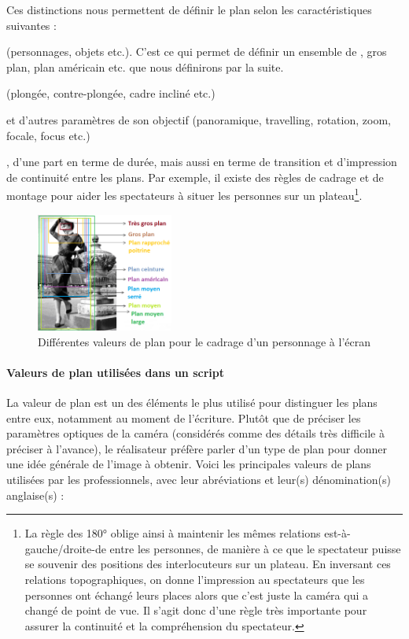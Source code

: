 Ces distinctions nous permettent de définir le plan selon les caractéristiques suivantes : 
\begin{liste}
	\item {} (personnages, objets etc.).
	C'est ce qui permet de définir un ensemble de , gros plan, plan américain etc. que nous définirons par la suite.
	
	\item {} (plongée, contre-plongée, cadre incliné etc.)

	\item {} et d'autres paramètres de son objectif (panoramique, travelling, rotation, zoom, focale, focus etc.)

	\item {}, d'une part en terme de durée, mais aussi en terme de transition et d'impression de continuité entre les plans. 
	Par exemple, il existe des règles de cadrage et de montage pour aider les spectateurs à situer les personnes sur un plateau\footnote{La règle des 180° oblige ainsi à maintenir les mêmes relations est-à-gauche/droite-de entre les personnes, de manière à ce que le spectateur puisse se souvenir des positions des interlocuteurs sur un plateau. En inversant ces relations topographiques, on donne l'impression au spectateurs que les personnes ont échangé leurs places alors que c'est juste la caméra qui a changé de point de vue. Il s'agit donc d'une règle très importante pour assurer la continuité et la compréhension du spectateur.}.
\end{liste}

\begin{figure}[ht!]
\centering
\includegraphics[width=0.4\textwidth]{./images/ValeurPlan-v1.png}
\caption{Différentes valeurs de plan pour le cadrage d'un personnage à l'écran}
\label{img:intro:script}
\end{figure}

\paragraph{Valeurs de plan utilisées dans un script}
La valeur de plan est un des éléments le plus utilisé pour distinguer les plans entre eux, notamment au moment de l'écriture. 
Plutôt que de préciser les paramètres optiques de la caméra (considérés comme des détails très difficile à préciser à l'avance), le réalisateur préfère parler d'un type de plan pour donner une idée générale de l'image à obtenir.
Voici les principales valeurs de plans utilisées par les professionnels, avec leur abréviations et leur(s) dénomination(s) anglaise(s) :

